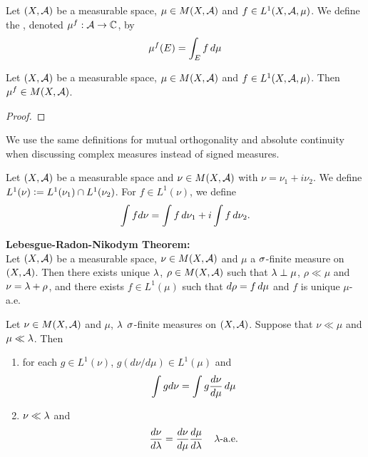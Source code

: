\documentclass{book}
\begin{document}
	\begin{defn}  
		Let $(X, \mathcal{A})$ be a measurable space, $\mu \in M(X, \mathcal{A})$ and $f \in L^1(X, \mathcal{A}, \mu)$. We define the , denoted $\mu^f: \mathcal{A} \rightarrow \mathbb{C}$, by 
		$$ \mu^f(E) = \int_E f \, d \mu $$
	\end{defn}

	\begin{ex}  
		Let $(X, \mathcal{A})$ be a measurable space, $\mu \in M(X, \mathcal{A})$ and $f \in L^1(X, \mathcal{A}, \mu)$. Then $\mu^f \in M(X, \mathcal{A})$.
	\end{ex}

	\begin{proof}
	\end{proof}
	
	\begin{note}
		We use the same definitions for mutual orthogonality and absolute continuity when discussing complex measures instead of signed measures.
	\end{note}
	
	\begin{defn}  
		Let $(X,\mathcal{A})$ be a measurable space and $\nu \in M(X, \mathcal{A})$ with $\nu = \nu_1 + i\nu_2$. We define $L^1(\nu) \vcentcolon= L^1(\nu_1)\cap L^1(\nu_2)$. For $f \in L^1(\nu)$, we define 
		$$\int f d\nu = \int f \, d \nu_1 + i \int f \, d \nu_2.$$
	\end{defn}
	
	\begin{thm}\textbf{Lebesgue-Radon-Nikodym Theorem:}\\
		Let $(X,\mathcal{A})$ be a measurable space, $\nu \in M(X, \mathcal{A})$ and $\mu$ a $\sigma$-finite measure on $(X, \mathcal{A})$. Then there exists unique $\lambda$, $\rho \in M(X, \mathcal{A})$ such that $\lambda \perp \mu$, $\rho \ll \mu$ and $\nu = \lambda + \rho$, and there exists $f \in L^1(\mu)$ such that $d\rho = f \, d \mu$ and $f$ is unique $\mu$-a.e.  
	\end{thm}
	
	\begin{ex}  
		Let $\nu \in M(X, \mathcal{A})$ and $\mu$, $\lambda$ $\sigma$-finite measures on $(X,\mathcal{A})$. Suppose that $\nu \ll \mu$ and $\mu \ll \lambda$. Then 
		\begin{enumerate}
			\item for each $g \in L^1(\nu)$, $g(d\nu/d\mu) \in  L^1(\mu)$ and 
			$$\int g d\nu = \int g \frac{d\nu}{d\mu} \, d \mu$$
			\item $\nu \ll \lambda$ and 
			$$\frac{d \nu}{d\lambda} = \frac{d \nu}{d\mu} \frac{d\mu}{d\lambda} \hspace{4mm} \lambda \text{-a.e.}$$
		\end{enumerate}
	\end{ex}
\end{document}
